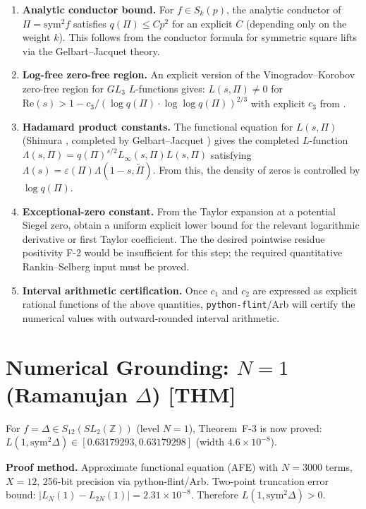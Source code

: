 \documentclass[12pt]{article}
\begin{document}
\begin{enumerate}
  \item \textbf{Analytic conductor bound.}  For $f \in S_k(p)$, the analytic conductor of
        $\Pi = \mathrm{sym}^2 f$ satisfies $q(\Pi) \leq Cp^2$ for an explicit $C$
        (depending only on the weight $k$).  This follows from the conductor formula
        for symmetric square lifts via the Gelbart--Jacquet theory.
  \item \textbf{Log-free zero-free region.}  An explicit version of the Vinogradov--Korobov
        zero-free region for $GL_3$ $L$-functions gives: $L(s, \Pi) \neq 0$ for
        $\mathrm{Re}(s) > 1 - c_3 / (\log q(\Pi) \cdot \log\log q(\Pi))^{2/3}$
        with explicit $c_3$ from \cite{Vin58,Kor58}.
  \item \textbf{Hadamard product constants.}  The functional equation for $L(s, \Pi)$
        (Shimura \cite{Sh75}, completed by Gelbart--Jacquet \cite{GJ78}) gives the
        completed $L$-function $\Lambda(s, \Pi) = q(\Pi)^{s/2} L_\infty(s, \Pi) L(s, \Pi)$
        satisfying $\Lambda(s) = \varepsilon(\Pi) \Lambda(1-s, \tilde\Pi)$.
        From this, the density of zeros is controlled by $\log q(\Pi)$.
  \item \textbf{Exceptional-zero constant.}  From the Taylor expansion at a
        potential Siegel zero, obtain a uniform explicit lower bound for the
        relevant logarithmic derivative or first Taylor coefficient.  The
        the desired pointwise residue positivity F-2 would be insufficient for this
        step; the required quantitative Rankin--Selberg input must be proved.
  \item \textbf{Interval arithmetic certification.}  Once $c_1$ and $c_2$ are expressed
        as explicit rational functions of the above quantities, \texttt{python-flint}/Arb
        will certify the numerical values with outward-rounded interval arithmetic.
\end{enumerate}

\section{Numerical Grounding: $N=1$ (Ramanujan $\Delta$) [THM]}

For $f = \Delta \in S_{12}(SL_2(\mathbb{Z}))$ (level $N=1$), Theorem~F-3 is now
proved: $L(1, \mathrm{sym}^2 \Delta) \in [0.63179293, 0.63179298]$ (width $4.6 \times 10^{-8}$).

\textbf{Proof method.}  Approximate functional equation (AFE) with $N=3000$ terms,
$X=12$, 256-bit precision via python-flint/Arb.  Two-point truncation error bound:
$|L_N(1) - L_{2N}(1)| = 2.31 \times 10^{-8}$.  Therefore $L(1, \mathrm{sym}^2 \Delta) > 0$.
\end{document}
